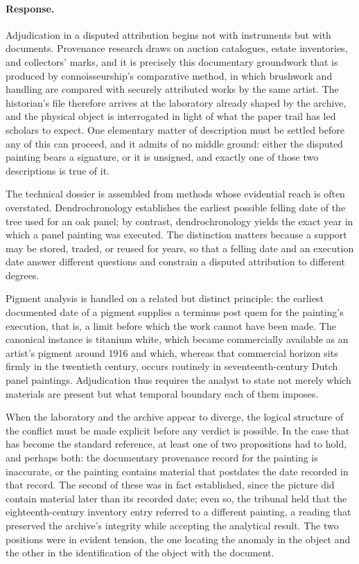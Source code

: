 \documentclass[11pt]{article}
\begin{document}
\paragraph{Response.} {\small Adjudication in a disputed attribution begins not with instruments but with documents. Provenance research draws on auction catalogues, estate inventories, and collectors' marks, and it is precisely this documentary groundwork that is produced by connoisseurship's comparative method, in which brushwork and handling are compared with securely attributed works by the same artist. The historian's file therefore arrives at the laboratory already shaped by the archive, and the physical object is interrogated in light of what the paper trail has led scholars to expect. One elementary matter of description must be settled before any of this can proceed, and it admits of no middle ground: either the disputed painting bears a signature, or it is unsigned, and exactly one of those two descriptions is true of it.

The technical dossier is assembled from methods whose evidential reach is often overstated. Dendrochronology establishes the earliest possible felling date of the tree used for an oak panel; by contrast, dendrochronology yields the exact year in which a panel painting was executed. The distinction matters because a support may be stored, traded, or reused for years, so that a felling date and an execution date answer different questions and constrain a disputed attribution to different degrees.

Pigment analysis is handled on a related but distinct principle: the earliest documented date of a pigment supplies a terminus post quem for the painting's execution, that is, a limit before which the work cannot have been made. The canonical instance is titanium white, which became commercially available as an artist's pigment around 1916 and which, whereas that commercial horizon sits firmly in the twentieth century, occurs routinely in seventeenth-century Dutch panel paintings. Adjudication thus requires the analyst to state not merely which materials are present but what temporal boundary each of them imposes.

When the laboratory and the archive appear to diverge, the logical structure of the conflict must be made explicit before any verdict is possible. In the case that has become the standard reference, at least one of two propositions had to hold, and perhaps both: the documentary provenance record for the painting is inaccurate, or the painting contains material that postdates the date recorded in that record. The second of these was in fact established, since the picture did contain material later than its recorded date; even so, the tribunal held that the eighteenth-century inventory entry referred to a different painting, a reading that preserved the archive's integrity while accepting the analytical result. The two positions were in evident tension, the one locating the anomaly in the object and the other in the identification of the object with the document.

}
\end{document}
